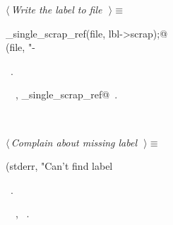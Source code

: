 \documentclass{report}
\begin{document}
\begin{flushleft} \small
\begin{minipage}{\linewidth} \label{scrap243}
$\langle\,${\it Write the label to file}\nobreak\ {\footnotesize {}}$\,\rangle\equiv$
\vspace{-1ex}
\begin{list}{}{} \item
\mbox{}\verb@write_single_scrap_ref(file, lbl->scrap);@\\
\mbox{}\verb@fprintf(file, "-%02d", lbl->seq);@{\NWsep}
\end{list}
\vspace{-1ex}
\footnotesize\addtolength{\baselineskip}{-1ex}
\begin{list}{}{\setlength{\itemsep}{-\parsep}\setlength{\itemindent}{-\leftmargin}}
\item \NWtxtMacroRefIn\ .
\end{list}
\vspace{-2ex}
\footnotesize\addtolength{\baselineskip}{-1ex}
\begin{list}{}{\setlength{\itemsep}{-\parsep}\setlength{\itemindent}{-\leftmargin}}
\item \NWtxtIdentsUsed\nobreak\  \verb@fprintf@\nobreak\ , \verb@write_single_scrap_ref@\nobreak\ .\end{list}
\end{minipage}\\[4ex]
\end{flushleft}
\begin{flushleft} \small
\begin{minipage}{\linewidth} \label{scrap244}
$\langle\,${\it Complain about missing label}\nobreak\ {\footnotesize {}}$\,\rangle\equiv$
\vspace{-1ex}
\begin{list}{}{} \item
\mbox{}\verb@fprintf(stderr, "Can't find label %s.\n", label_name);@{\NWsep}
\end{list}
\vspace{-1ex}
\footnotesize\addtolength{\baselineskip}{-1ex}
\begin{list}{}{\setlength{\itemsep}{-\parsep}\setlength{\itemindent}{-\leftmargin}}
\item \NWtxtMacroRefIn\ .
\end{list}
\vspace{-2ex}
\footnotesize\addtolength{\baselineskip}{-1ex}
\begin{list}{}{\setlength{\itemsep}{-\parsep}\setlength{\itemindent}{-\leftmargin}}
\item \NWtxtIdentsUsed\nobreak\  \verb@fprintf@\nobreak\ , \verb@stderr@\nobreak\ .\end{list}
\end{minipage}\\[4ex]
\end{flushleft}
\end{document}
